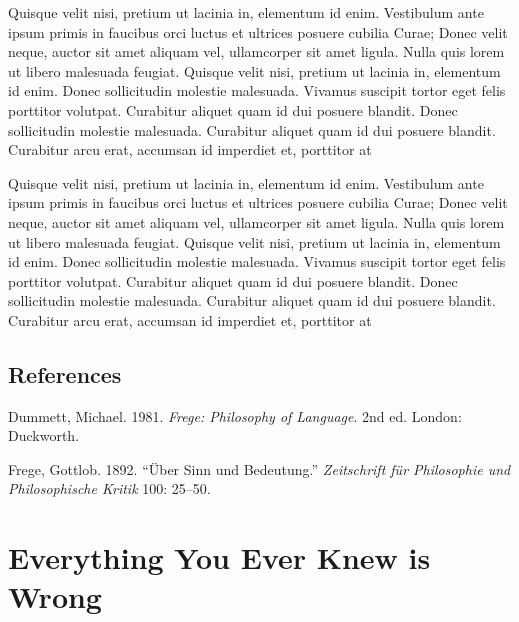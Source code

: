 \documentclass{scrbook}
\makeatletter
\def\@comingchapterauthor{} %
\def\@chapterauthor{} %
\newcommand{\chapterauthor}[1]{\def\@comingchapterauthor{#1}}
\let\oldchapter\chapter
\renewcommand{\chapter}[2][]{%
   \clearpage%
   \let\@chapterauthor\@comingchapterauthor%
   \oldchapter[#1]{#2}%
}
\newlength{\cslhangindent}
\newlength{\cslentryspacingunit} %
\newenvironment{CSLReferences}[2] %
 {%
  \setlength{\parindent}{0pt}
  \ifodd #1
  \let\oldpar\par
  \def\par{\hangindent=\cslhangindent\oldpar}
  \fi
  \setlength{\parskip}{#2\cslentryspacingunit}
 }%
 {}
\makeatother
\begin{document}
Quisque velit nisi, pretium ut lacinia in, elementum id enim. Vestibulum
ante ipsum primis in faucibus orci luctus et ultrices posuere cubilia
Curae; Donec velit neque, auctor sit amet aliquam vel, ullamcorper sit
amet ligula. Nulla quis lorem ut libero malesuada feugiat. Quisque velit
nisi, pretium ut lacinia in, elementum id enim. Donec sollicitudin
molestie malesuada. Vivamus suscipit tortor eget felis porttitor
volutpat. Curabitur aliquet quam id dui posuere blandit. Donec
sollicitudin molestie malesuada. Curabitur aliquet quam id dui posuere
blandit. Curabitur arcu erat, accumsan id imperdiet et, porttitor at

Quisque velit nisi, pretium ut lacinia in, elementum id enim. Vestibulum
ante ipsum primis in faucibus orci luctus et ultrices posuere cubilia
Curae; Donec velit neque, auctor sit amet aliquam vel, ullamcorper sit
amet ligula. Nulla quis lorem ut libero malesuada feugiat. Quisque velit
nisi, pretium ut lacinia in, elementum id enim. Donec sollicitudin
molestie malesuada. Vivamus suscipit tortor eget felis porttitor
volutpat. Curabitur aliquet quam id dui posuere blandit. Donec
sollicitudin molestie malesuada. Curabitur aliquet quam id dui posuere
blandit. Curabitur arcu erat, accumsan id imperdiet et, porttitor at

\hypertarget{c2-c2-references}{%
\section*{References}\label{c2-c2-references}}

\hypertarget{c2-refs}{}
\begin{CSLReferences}{1}{0}
\leavevmode{}%
Dummett, Michael. 1981. \emph{Frege: Philosophy of Language}. 2nd ed.
{London}: {Duckworth}.

\leavevmode{}%
Frege, Gottlob. 1892. {``Über Sinn und Bedeutung.''} \emph{Zeitschrift
für Philosophie und Philosophische Kritik} 100: 25--50.

\end{CSLReferences}

\chapterauthor{Al Coholic and Seymour Butt}
\chapter[Everything is Wrong]{Everything You Ever Knew is Wrong}
\end{document}
